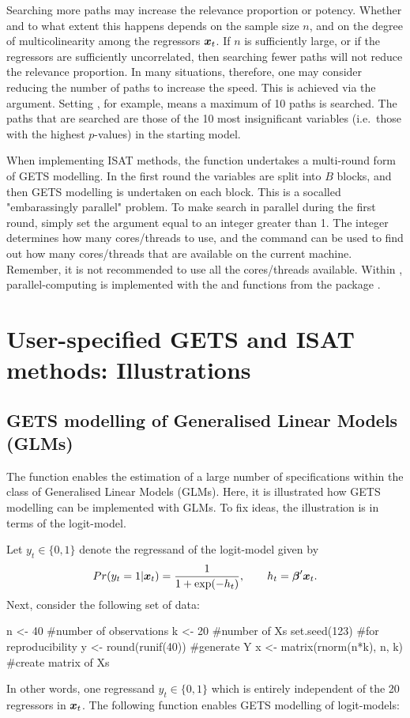 Searching more paths may increase the relevance proportion or potency. Whether and to what extent this happens depends on the sample size $n$, and on the degree of multicolinearity among the regressors $\boldsymbol{x}_t$. If $n$ is sufficiently large, or if the regressors are sufficiently uncorrelated, then searching fewer paths will not reduce the relevance proportion. In many situations, therefore, one may consider reducing the number of paths to increase the speed. This is achieved via the  argument. Setting , for example, means a maximum of 10 paths is searched. The paths that are searched are those of the 10 most insignificant variables (i.e.\ those with the highest $p$-values) in the starting model.

When implementing ISAT methods, the function  undertakes a multi-round form of GETS modelling. In the first round the variables are split into $B$ blocks, and then GETS modelling is undertaken on each block. This is a socalled "embarassingly parallel" problem. To make  search in parallel during the first round, simply set the argument  equal to an integer greater than 1. The integer determines how many cores/threads to use, and the command  can be used to find out how many cores/threads that are available on the current machine. Remember, it is not recommended to use all the cores/threads available. Within , parallel-computing is implemented with the  and  functions from the package .

\section{User-specified GETS and ISAT methods: Illustrations}

\subsection{GETS modelling of Generalised Linear Models (GLMs)}

The function  enables the estimation of a large number of specifications within the class of Generalised Linear Models (GLMs). Here, it is illustrated how GETS modelling can be implemented with GLMs. To fix ideas, the illustration is in terms of the logit-model.

Let $y_t \in \{0,1\}$ denote the regressand of the logit-model given by
%
\begin{equation}
	Pr(y_t=1|\boldsymbol{x}_t) = \frac{1}{1+\exp(-h_t)}, \qquad h_t = \boldsymbol{\beta}'\boldsymbol{x}_t.
\end{equation}
%
Next, consider the following set of data:
%
\begin{example}
  n <- 40 #number of observations
  k <- 20 #number of Xs
  set.seed(123) #for reproducibility
  y <- round(runif(40)) #generate Y
  x <- matrix(rnorm(n*k), n, k) #create matrix of Xs
\end{example}
%
In other words, one regressand $y_t \in \{0,1\}$ which is entirely independent of the 20 regressors in $\boldsymbol{x}_t$. The following function enables GETS modelling of logit-models:


